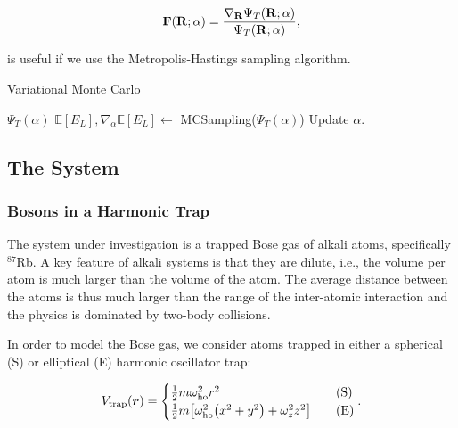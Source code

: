 \begin{equation}\label{eq:drift_force}
    \vb{F(\vb{R};\alpha)} = \frac{\nabla_{\vb{R}}\Psi_T(\vb{R};\alpha)}{\Psi_T(\vb{R};\alpha)},
\end{equation}

is useful if we use the Metropolis-Hastings sampling algorithm. 


\begin{algorithm}
\caption{Variational Monte Carlo}\label{algo:variational_monte_carlo}
\begin{algorithmic}[1]
\State $\Psi_T(\alpha)$
\State $\mathbb{E}[E_L], \nabla_{\alpha}\mathbb{E}[E_L]\gets$ MCSampling($\Psi_T(\alpha)$)
\State Update $\alpha$. 

\end{algorithmic}
\end{algorithm}

\subsection{The System}

\subsubsection{Bosons in a Harmonic Trap}

The system under investigation is a trapped Bose gas of alkali atoms, specifically $^{87}$Rb. A key feature of alkali systems is that they are dilute, i.e., the volume per atom is much larger than the volume of the atom. The average distance between the atoms is thus much larger than the range of the inter-atomic interaction and the physics is dominated by two-body collisions. 

In order to model the Bose gas, we consider atoms trapped in either a spherical (S) or elliptical (E) harmonic oscillator trap: 

\begin{equation}\label{eq:Vtrap}
    V_\mathrm{trap} \qty(\bm{r}) = 
    \begin{cases}
        \frac{1}{2} m \omega_\mathrm{ho}^2 r^2 \quad &\text{(S)}
        \\
        \frac{1}{2} m \qty[\omega_\mathrm{ho}^2 \qty(x^2 + y^2) + \omega_z^2 z^2] \quad &\text{(E)}
    \end{cases}.
\end{equation}

